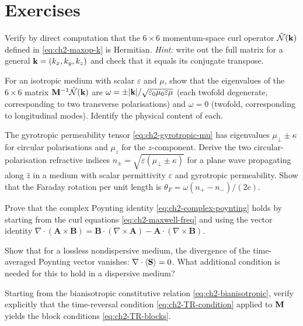 \section*{Exercises}

\begin{exercise}
  Verify by direct computation that the $6\times6$ momentum-space curl
  operator $\hat{\mathcal{N}}(\mathbf{k})$ defined in \eqref{eq:ch2-maxop-k} is
  Hermitian.  \emph{Hint:} write out the full matrix for a general
  $\mathbf{k}=(k_x,k_y,k_z)$ and check that it equals its conjugate
  transpose.
\end{exercise}

\begin{exercise}
  For an isotropic medium with scalar $\varepsilon$ and $\mu$, show
  that the eigenvalues of the $6\times 6$ matrix
  $\mathbf{M}^{-1}\hat{\mathcal{N}}(\mathbf{k})$ are
  $\omega=\pm|\mathbf{k}|/\sqrt{\varepsilon_0\mu_0\varepsilon\mu}$
  (each twofold degenerate, corresponding to two transverse
  polarisations) and $\omega=0$ (twofold, corresponding to
  longitudinal modes).  Identify the physical content of each.
\end{exercise}

\begin{exercise}
  The gyrotropic permeability tensor \eqref{eq:ch2-gyrotropic-mu} has
  eigenvalues $\mu_\perp\pm\kappa$ for circular polarisations and
  $\mu_z$ for the $z$-component.  Derive the two circular-polarisation
  refractive indices $n_\pm=\sqrt{\varepsilon(\mu_\perp\pm\kappa)}$
  for a plane wave propagating along $\hat{z}$ in a medium with scalar
  permittivity $\varepsilon$ and gyrotropic permeability.  Show that
  the Faraday rotation per unit length is
  $\theta_F=\omega(n_+-n_-)/(2c)$.
\end{exercise}

\begin{exercise}
  Prove that the complex Poynting identity
  \eqref{eq:ch2-complex-poynting} holds by starting from the curl
  equations \eqref{eq:ch2-maxwell-freq} and using the vector identity
  $\nabla\cdot(\mathbf{A}\times\mathbf{B})
  =\mathbf{B}\cdot(\nabla\times\mathbf{A})
  -\mathbf{A}\cdot(\nabla\times\mathbf{B})$.
\end{exercise}

\begin{exercise}
  Show that for a lossless nondispersive medium, the divergence of the
  time-averaged Poynting vector vanishes:
  $\nabla\cdot\langle\mathbf{S}\rangle=0$.  What additional condition is
  needed for this to hold in a dispersive medium?
\end{exercise}

\begin{exercise}
  Starting from the bianisotropic constitutive relation
  \eqref{eq:ch2-bianisotropic}, verify explicitly that the
  time-reversal condition \eqref{eq:ch2-TR-condition} applied to
  $\mathbf{M}$ yields the block conditions \eqref{eq:ch2-TR-blocks}.
\end{exercise}
